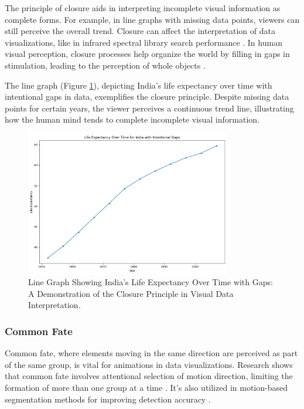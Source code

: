 The principle of closure aids in interpreting incomplete visual information as complete forms. For example, in line graphs with missing data points, viewers can still perceive the overall trend. Closure can affect the interpretation of data visualizations, like in infrared spectral library search performance \cite{harringtonClosureEffectsInfrared1987}. In human visual perception, closure processes help organize the world by filling in gaps in stimulation, leading to the perception of whole objects \cite{chenInvestigationClosureProcess1998}.

The line graph (Figure \ref{fig:lo2_line_chart_w_gaps}), depicting India's life expectancy over time with intentional gaps in data, exemplifies the closure principle. Despite missing data points for certain years, the viewer perceives a continuous trend line, illustrating how the human mind tends to complete incomplete visual information.

\begin{figure}[h]
    \centering
    \includegraphics[width=0.8\textwidth]{images/plots/lo2_life_exp_over_time_with_gaps_India.png} 
    \caption{Line Graph Showing India's Life Expectancy Over Time with Gaps: A Demonstration of the Closure Principle in Visual Data Interpretation.}
    \label{fig:lo2_line_chart_w_gaps}
\end{figure}

\subsubsection{Common Fate}

Common fate, where elements moving in the same direction are perceived as part of the same group, is vital for animations in data visualizations. Research shows that common fate involves attentional selection of motion direction, limiting the formation of more than one group at a time \cite{levinthalCommonFateGroupingFeature2011}. It's also utilized in motion-based segmentation methods for improving detection accuracy \cite{kopacsiCommonFateBased2019}.